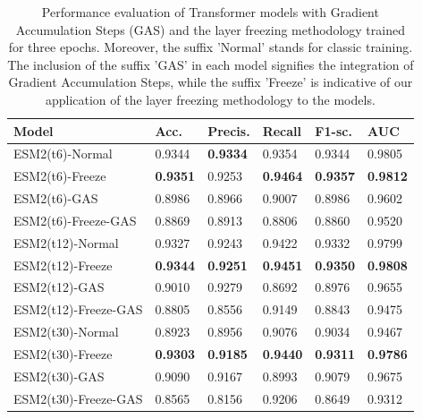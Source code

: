 \begin{table}[h]
	\centering
	\caption{Performance evaluation of Transformer models with Gradient Accumulation Steps (GAS) and the layer freezing methodology trained for three epochs. Moreover, the suffix 'Normal' stands for classic training. The inclusion of the suffix 'GAS' in each model signifies the integration of Gradient Accumulation Steps, while the suffix 'Freeze' is indicative of our application of the layer freezing methodology to the models.}
	\label{tab:comparison_3_epochs}
	
	\scriptsize
	\begin{tabular}{llllll} \hline
		\textbf{Model}       & \textbf{Acc.} & \textbf{Precis.} & \textbf{Recall} & \textbf{F1-sc.} & \textbf{AUC}   %
		\\ \hline
		ESM2(t6)-Normal             & 0.9344            & \textbf{0.9334}    & 0.9354          & 0.9344            & 0.9805          %
		\\
		ESM2(t6)-Freeze      & \textbf{0.9351}   & 0.9253             & \textbf{0.9464} & \textbf{0.9357}   & \textbf{0.9812} %
		\\
		ESM2(t6)-GAS         & 0.8986            & 0.8966             & 0.9007          & 0.8986            & 0.9602          %
		\\
		ESM2(t6)-Freeze-GAS  & 0.8869            & 0.8913             & 0.8806          & 0.8860            & 0.9520          %
		\\ \hline
		
		
		ESM2(t12)-Normal            & 0.9327            & 0.9243             & 0.9422          & 0.9332            & 0.9799          %
		\\
		ESM2(t12)-Freeze     & \textbf{0.9344}   & \textbf{0.9251}    & \textbf{0.9451} & \textbf{0.9350}   & \textbf{0.9808} %
		\\
		ESM2(t12)-GAS        & 0.9010            & 0.9279             & 0.8692          & 0.8976            & 0.9655          %
		\\
		ESM2(t12)-Freeze-GAS & 0.8805            & 0.8556             & 0.9149          & 0.8843            & 0.9475          %
		\\ \hline
		
		
		ESM2(t30)-Normal             & 0.8923                 & 0.8956                  & 0.9076               & 0.9034                 & 0.9467               %
		\\
		ESM2(t30)-Freeze     & \textbf{0.9303}   & \textbf{0.9185}    & \textbf{0.9440} & \textbf{0.9311}   & \textbf{0.9786} %
		\\
		ESM2(t30)-GAS        & 0.9090            & 0.9167             & 0.8993          & 0.9079            & 0.9675          %
		\\
		ESM2(t30)-Freeze-GAS & 0.8565            & 0.8156             & 0.9206          & 0.8649            & 0.9312          %
		\\ \hline
		

\end{tabular}
\end{table}
